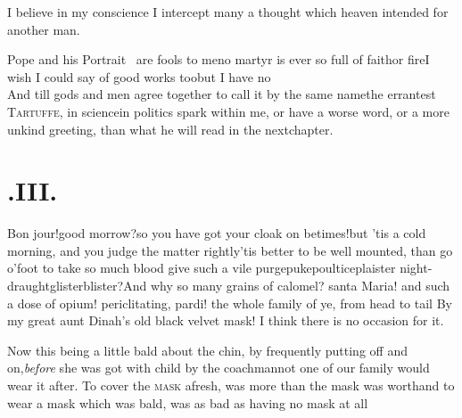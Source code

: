 \documentclass{article}
\begin{document}
I believe in my conscience I intercept many a thought which
heaven intended for another man.


Pope and his Portrait \fnast\  are fools to\break
me\tsh no martyr is ever so full of faith\break or
fire\tsh I wish I could say of good works too\tsh but I have
no\\
\break
And till gods and men agree together to call it by the same
name\tsh the errant\-est \textsc{Tartuffe}, in science\tsk in
politics\break
{}
spark within
me, or have a worse word, or a more unkind greeting,\break
{}\break
{}
\eject
\noindent
than what he will read in the next\break chapter.

\section{.\enspace III.}

\noindent\quad
\tsh Bon jour!\tsh good
morrow?\break\tsh so you have got your cloak on
betimes!\tsh but ’tis a cold morning, and you judge
the matter rightly\tsh ’tis better to be well
mounted, than go \hbox{o’\thinspace foot}\break
{}
 to take so much blood\tsk
give such a vile purge\tsk puke\tsk poultice\tsk plaister\tsk
night-draught\tsk glister\tsk blister?\tsh And why so many
grains of calomel? santa Maria! and such a dose of opium!
periclitating, pardi! the whole family of ye, from head to tail\tsh 
By my great aunt Dinah’s old black velvet mask! I think
there is no occasion for it.

Now this being a little bald about the chin, by frequently
putting off and on,\break \textit{before} she was got with child by the
coachman\tsk not one of our family would wear it after. To cover
the \textsc{mask} afresh, was more than the mask was
worth\tsh and to wear a mask which was bald, 
was as bad as having no mask at all\tsh
\end{document}
